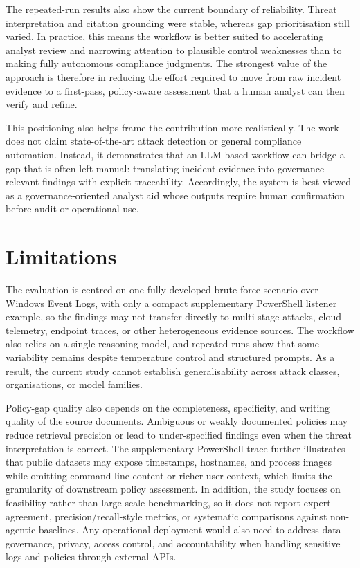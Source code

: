 \documentclass[conference]{IEEEtran}
\begin{document}
The repeated-run results also show the current boundary of reliability. Threat interpretation and citation grounding were stable, whereas gap prioritisation still varied. In practice, this means the workflow is better suited to accelerating analyst review and narrowing attention to plausible control weaknesses than to making fully autonomous compliance judgments. The strongest value of the approach is therefore in reducing the effort required to move from raw incident evidence to a first-pass, policy-aware assessment that a human analyst can then verify and refine.

This positioning also helps frame the contribution more realistically. The work does not claim state-of-the-art attack detection or general compliance automation. Instead, it demonstrates that an LLM-based workflow can bridge a gap that is often left manual: translating incident evidence into governance-relevant findings with explicit traceability. Accordingly, the system is best viewed as a governance-oriented analyst aid whose outputs require human confirmation before audit or operational use.


\section{Limitations}
The evaluation is centred on one fully developed brute-force scenario over Windows Event Logs, with only a compact supplementary PowerShell listener example, so the findings may not transfer directly to multi-stage attacks, cloud telemetry, endpoint traces, or other heterogeneous evidence sources. The workflow also relies on a single reasoning model, and repeated runs show that some variability remains despite temperature control and structured prompts. As a result, the current study cannot establish generalisability across attack classes, organisations, or model families.

Policy-gap quality also depends on the completeness, specificity, and writing quality of the source documents. Ambiguous or weakly documented policies may reduce retrieval precision or lead to under-specified findings even when the threat interpretation is correct. The supplementary PowerShell trace further illustrates that public datasets may expose timestamps, hostnames, and process images while omitting command-line content or richer user context, which limits the granularity of downstream policy assessment. In addition, the study focuses on feasibility rather than large-scale benchmarking, so it does not report expert agreement, precision/recall-style metrics, or systematic comparisons against non-agentic baselines. Any operational deployment would also need to address data governance, privacy, access control, and accountability when handling sensitive logs and policies through external APIs.
\end{document}
